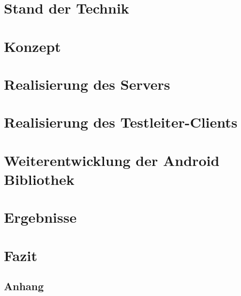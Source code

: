 \documentclass[11pt,a4paper,bibliography=totocnumbered,listof=totocnumbered]{scrartcl}
\begin{document}
\section{Stand der Technik}





\section{Konzept}




\section{Realisierung des Servers\label{sec:realisierung_server}}





\section{Realisierung des Testleiter-Clients\label{sec:relisierung_client}}


\section{Weiterentwicklung der Android Bibliothek}

\section{Ergebnisse}

\section{Fazit}


\renewcommand\refname{Quellenverzeichnis}
\pagebreak
\singlespacing %
\setlength{\bibitemsep}{12pt} %
\printbibliography
\clearpage
{}
\setcounter{page}{1}

\begin{appendix}
\section*{Anhang}
{}



\end{appendix}



\end{document}
